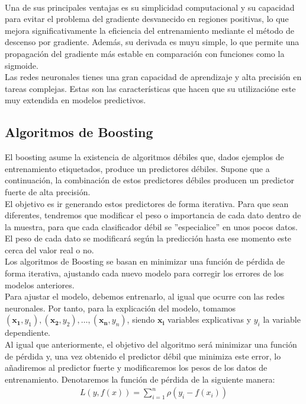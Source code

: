 \documentclass[11pt]{book}
\theoremstyle{plain} %
\theoremstyle{definition} %
\begin{document}
\hfil\\
Una de sus principales ventajas es su simplicidad computacional y su capacidad para 
evitar el problema del gradiente desvanecido en regiones positivas, lo que mejora 
significativamente la eficiencia del entrenamiento mediante el método de descenso por 
gradiente. Además, su derivada es muyu simple, lo que  permite una propagación del 
gradiente más estable en comparación con funciones como la sigmoide. \\

Las redes neuronales tienes una gran capacidad de aprendizaje y alta precisión en 
tareas complejas. Estas son las características que hacen que su utilizacióne este muy 
extendida en modelos predictivos.\\

\subsection{Algoritmos de Boosting}
El boosting asume la existencia de algoritmos débiles que, dados ejemplos de 
entrenamiento etiquetados, produce un predictores débiles. Supone que a continuación, 
la combinación de estos predictores débiles producen un predictor fuerte de alta precisión.\\

El objetivo es ir generando estos predictores de forma iterativa. Para que sean diferentes, 
tendremos que modificar el peso o importancia de cada dato dentro de la muestra, 
para que cada clasificador débil se ''especialice'' en unos pocos datos. El peso de cada 
dato se modificará según la predicción hasta ese momento este cerca del valor real o no. \\

Los algoritmos de Boosting se basan en minimizar una función de pérdida de forma 
iterativa, ajustando cada nuevo modelo para corregir los errores de los modelos anteriores.\\

Para ajustar el modelo, debemos entrenarlo, al igual que ocurre con las redes 
neuronales. Por tanto, para la explicación del modelo, tomamos 
$(\mathbf{x_1}, y_1), (\mathbf{x_2}, y_2), \dots, (\mathbf{x_n}, y_n)$, siendo $\mathbf{x_i}$ 
variables explicativas y $y_i$ la variable dependiente. \\

Al igual que anteriormente, el objetivo del algoritmo será minimizar una función de pérdida 
y, una vez obtenido el predictor débil que minimiza este error, lo añadiremos al predictor 
fuerte y modificaremos los pesos de los datos de entrenamiento. Denotaremos la 
función de pérdida de la siguiente manera:
\begin{align*}
   L(y, f(x)) =\sum_{i=1}^n \rho(y_i-f(x_i))
\end{align*}
\end{document}
